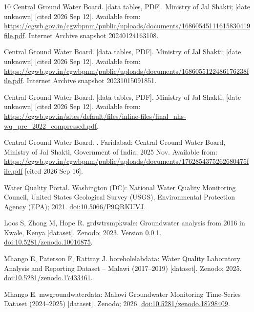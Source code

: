 \documentclass[10pt,letterpaper]{article}
\begin{document}
\begin{thebibliography}{10}
{Central Ground Water Board}.
 [data tables, PDF]. Ministry of
  Jal Shakti; [date unknown] [cited 2026 Sep 12].
\newblock Available from:
  \url{https://cgwb.gov.in/cgwbpnm/public/uploads/documents/16860545111615830419file.pdf}.
\newblock Internet Archive snapshot 20240124163108.

{Central Ground Water Board}.
 [data tables, PDF]. Ministry of
  Jal Shakti; [date unknown] [cited 2026 Sep 12].
\newblock Available from:
  \url{https://cgwb.gov.in/cgwbpnm/public/uploads/documents/1686055122486176238file.pdf}.
\newblock Internet Archive snapshot 20231015091851.

{Central Ground Water Board}.
 [data tables, PDF]. Ministry of Jal Shakti; [date
  unknown] [cited 2026 Sep 12].
\newblock Available from:
  \url{https://cgwb.gov.in/sites/default/files/inline-files/final_nhs-wq_pre_2022_compressed.pdf}.

{Central Ground Water Board}.
.
\newblock Faridabad: Central Ground Water Board, Ministry of Jal Shakti,
  Government of India; 2025 Nov.
\newblock Available from:
  \url{https://cgwb.gov.in/cgwbpnm/public/uploads/documents/1762854375262680475file.pdf}
  [cited 2026 Sep 16].

{Water Quality Portal}. Washington (DC): National Water Quality Monitoring
  Council, United States Geological Survey (USGS), Environmental Protection
  Agency (EPA); 2021.
\newblock \href {http://dx.doi.org/10.5066/P9QRKUVJ} {doi:10.5066/P9QRKUVJ}.

{Loos} S, {Zhong} M, {Hope} R. {grdwtrsmpkwale: Groundwater analysis from 2016
  in Kwale, Kenya} [dataset]. Zenodo; 2023.
\newblock Version 0.0.1.
\newblock \href {http://dx.doi.org/10.5281/zenodo.10016875}
  {doi:10.5281/zenodo.10016875}.

{Mhango} E, {Paterson} F, {Rattray} J. {boreholelabdata: Water Quality
  Laboratory Analysis and Reporting Dataset -- Malawi (2017--2019)} [dataset].
  Zenodo; 2025.
\newblock \href {http://dx.doi.org/10.5281/zenodo.17433461}
  {doi:10.5281/zenodo.17433461}.

{Mhango} E. {mwgroundwaterdata: Malawi Groundwater Monitoring Time-Series
  Dataset (2024--2025)} [dataset]. Zenodo; 2026.
\newblock \href {http://dx.doi.org/10.5281/zenodo.18798409}
  {doi:10.5281/zenodo.18798409}.


\end{thebibliography}
\end{document}
